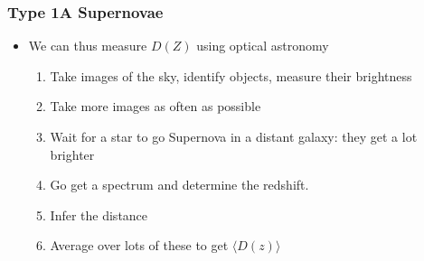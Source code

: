 \documentclass{beamer}
\begin{document}
\frame
{

    \frametitle{Type 1A Supernovae}


    \begin{itemize}

        \item We can thus measure {\color{gold} $D(Z)$} using optical astronomy 

            \begin{enumerate}

                \item Take images of the sky, identify objects, measure their brightness

                \item Take more images as often as possible

                \item Wait for a star to go Supernova in a distant
                    galaxy: they get a lot brighter

                \item Go get a spectrum and determine the redshift.

                \item Infer the distance

                \item Average over lots of these to get {\color{gold} $\langle
                    D(z) \rangle$ }

            \end{enumerate}

    \end{itemize}

}
\end{document}

